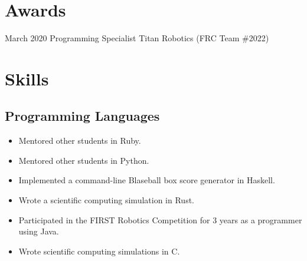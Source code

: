 \documentclass[letterpaper]{resume}
\begin{document}
    \section{Awards}
    \begin{blocklist}
            {March 2020}
            {Programming Specialist}
            {Titan Robotics (FRC Team \#2022)}
    \end{blocklist}
    
    \section{Skills}
    \subsection{Programming Languages}
    \begin{itemize}
        \item Mentored other students in Ruby.
        \item Mentored other students in Python.
        \item Implemented a command-line
            Blaseball box score generator in
            Haskell.
        \item Wrote a scientific computing simulation in Rust.
        \item Participated in the FIRST Robotics Competition for 
            3 years as a programmer using Java.
        \item Wrote scientific computing simulations in C\sharp.
    \end{itemize}
\end{document}
